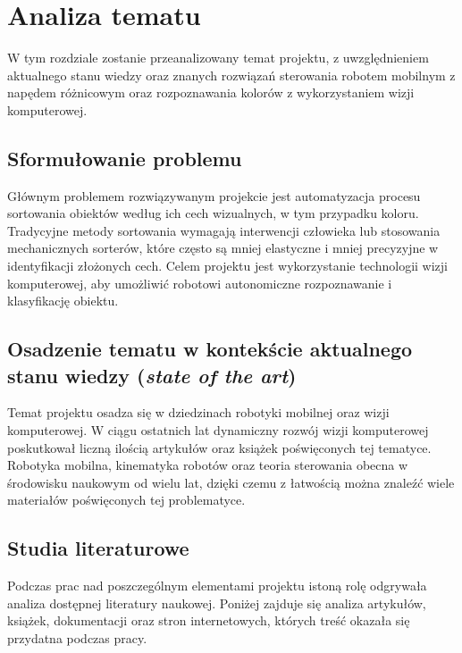 \chapter{Analiza tematu}
\label{ch:analiza}

W tym rozdziale zostanie przeanalizowany temat projektu, z uwzględnieniem aktualnego stanu wiedzy oraz znanych rozwiązań sterowania robotem mobilnym z napędem różnicowym oraz rozpoznawania kolorów z wykorzystaniem wizji komputerowej.

\section{Sformułowanie problemu}
\label{sec:sformulowanie_problemu}

Głównym problemem rozwiązywanym projekcie jest automatyzacja procesu sortowania obiektów według ich cech wizualnych, w tym przypadku koloru. Tradycyjne metody sortowania wymagają interwencji człowieka lub stosowania mechanicznych sorterów, które często są mniej elastyczne i mniej precyzyjne w identyfikacji złożonych cech. Celem projektu jest wykorzystanie technologii wizji komputerowej, aby umożliwić robotowi autonomiczne rozpoznawanie i klasyfikację obiektu.

\section{Osadzenie tematu w kontekście aktualnego stanu wiedzy (\textit{state of the art})}
\label{sec:state_of_the_art}

Temat projektu osadza się w dziedzinach robotyki mobilnej oraz wizji komputerowej. W ciągu ostatnich lat dynamiczny rozwój wizji komputerowej poskutkował liczną ilością artykułów oraz książek poświęconych tej tematyce. Robotyka mobilna, kinematyka robotów oraz teoria sterowania obecna w środowisku naukowym od wielu lat, dzięki czemu z łatwością można znaleźć wiele materiałów poświęconych tej problematyce. 

\section{Studia literaturowe}
\label{sec:studia_literaturowe}

Podczas prac nad poszczególnym elementami projektu istoną rolę odgrywała analiza dostępnej literatury naukowej. Poniżej zajduje się analiza artykułów, książek, dokumentacji oraz stron internetowych, których treść okazała się przydatna podczas pracy. 

